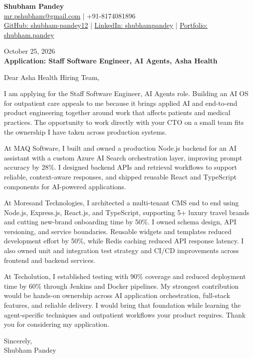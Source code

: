 \documentclass[a4paper,10pt]{article}
\begin{document}
\begin{center}
{\LARGE\textbf{Shubham Pandey}}\\[3pt]
\href{mailto:mr.pshubham@gmail.com}{mr.pshubham@gmail.com} | +91-8174081896\\[2pt]
\href{https://github.com/shubham-pandey12}{GitHub: shubham-pandey12} | \href{https://www.linkedin.com/in/shubham-pandey-a74716199/}{LinkedIn: shubhampandey} | \href{https://shubham-portfolio-mocha.vercel.app/}{Portfolio: shubham.pandey}
\end{center}
October 25, 2026\\[6pt]
\textbf{Application: Staff Software Engineer, AI Agents, Asha Health}

\vspace{12pt}
Dear Asha Health Hiring Team,

\vspace{6pt}
I am applying for the Staff Software Engineer, AI Agents role. Building an AI OS for outpatient care appeals to me because it brings applied AI and end-to-end product engineering together around work that affects patients and medical practices. The opportunity to work directly with your CTO on a small team fits the ownership I have taken across production systems.

\vspace{6pt}
At MAQ Software, I built and owned a production Node.js backend for an AI assistant with a custom Azure AI Search orchestration layer, improving prompt accuracy by 28\%. I designed backend APIs and retrieval workflows to support reliable, context-aware responses, and shipped reusable React and TypeScript components for AI-powered applications.

\vspace{6pt}
At Moresand Technologies, I architected a multi-tenant CMS end to end using Node.js, Express.js, React.js, and TypeScript, supporting 5+ luxury travel brands and cutting new-brand onboarding time by 50\%. I owned schema design, API versioning, and service boundaries. Reusable widgets and templates reduced development effort by 50\%, while Redis caching reduced API response latency. I also owned unit and integration test strategy and CI/CD improvements across frontend and backend services.

\vspace{6pt}
At Techolution, I established testing with 90\% coverage and reduced deployment time by 60\% through Jenkins and Docker pipelines. My strongest contribution would be hands-on ownership across AI application orchestration, full-stack features, and reliable delivery. I would bring that foundation while learning the agent-specific techniques and outpatient workflows your product requires. Thank you for considering my application.

\vspace{6pt}
Sincerely,\\[4pt]Shubham Pandey
\end{document}
